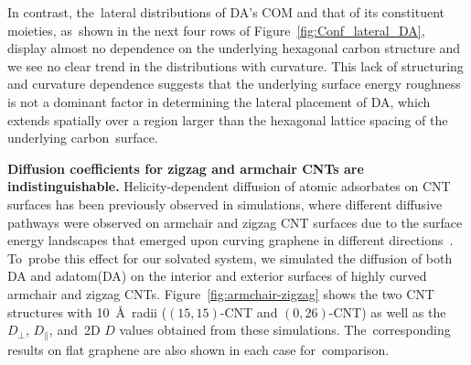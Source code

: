 \documentclass[molecules,article,accept,pdftex,moreauthors]{Definitions/mdpi}
\begin{document}
In contrast, the~lateral distributions of DA's COM and that of its constituent moieties, as~shown in the next four rows of Figure~\ref{fig:Conf_lateral_DA}, display almost no dependence on the underlying hexagonal carbon structure and we see no clear trend in the distributions with curvature. This lack of structuring and curvature dependence suggests that the underlying surface energy roughness is not a dominant factor in determining the lateral placement of DA, which extends spatially over a region larger than the hexagonal lattice spacing of the underlying carbon~surface. 



{\bf Diffusion coefficients for zigzag and armchair CNTs are indistinguishable.} %
Helicity-dependent diffusion of atomic adsorbates on CNT surfaces has been previously observed in simulations, where different diffusive pathways were observed on armchair and zigzag CNT surfaces due to the surface energy landscapes that emerged upon curving graphene in different directions~\cite{Wu2006, Shu2001}. To~probe this effect for our solvated system, we simulated the diffusion of both DA and adatom(DA) on the interior and exterior surfaces of highly curved armchair and zigzag CNTs. Figure~\ref{fig:armchair-zigzag} shows the two CNT structures with 10~\AA\ radii ($(15,15)$-CNT and $(0,26)$-CNT) as well as the $D_{\perp}$, $D_{\parallel}$, and~2D $D$ values obtained from these simulations. The~corresponding results on flat graphene are also shown in each case for~comparison.
\end{document}
